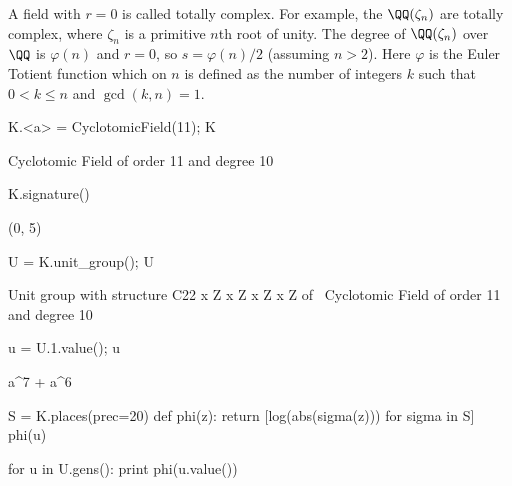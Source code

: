 A field with $r=0$ is called totally complex.  For
example, the  $\QQ(\zeta_n)$ are totally
complex, where $\zeta_n$ is a primitive $n$th root of
unity.  The degree of $\QQ(\zeta_n)$ over $\QQ$ is $\varphi(n)$ and $r=0$,
so $s=\varphi(n)/2$ (assuming $n>2$).
Here $\varphi$ is the Euler Totient function which on $n$
is defined as the number of integers $k$ such that $0<k\leq n$
and $\gcd(k,n)=1$.
\begin{sagecode}
\begin{sagecell}
K.<a> = CyclotomicField(11); K
\end{sagecell}
\begin{sageout}
Cyclotomic Field of order 11 and degree 10
\end{sageout}
\begin{sagecell}
K.signature()
\end{sagecell}
\begin{sageout}
(0, 5)
\end{sageout}
\begin{sagecell}
U = K.unit_group(); U
\end{sagecell}
\begin{sageout}
Unit group with structure C22 x Z x Z x Z x Z of \
Cyclotomic Field of order 11 and degree 10
\end{sageout}
\begin{sagecell}
u = U.1.value(); u
\end{sagecell}
\begin{sageout}
a^7 + a^6
\end{sageout}
\begin{sagecell}
S = K.places(prec=20)
def phi(z):
return [log(abs(sigma(z))) for sigma in S]
phi(u)
\end{sagecell}
\begin{sageout}
[-1.2566, -0.18533, 0.26982, 0.52028, 0.65180]
\end{sageout}
\begin{sagecell}
for u in U.gens():
print phi(u.value())
\end{sagecell}
\begin{sageout}
[0.00000, 0.00000, 0.00000, -9.5367e-7, 0.00000]
[-1.2566, -0.18533, 0.26982, 0.52028, 0.65180]
[-0.26981, -0.52028, 0.18533, -0.65180, 1.2566]
[0.65180, 0.26981, -1.2566, -0.18533, 0.52029]
[-0.084486, -1.1721, -0.33496, 0.60477, 0.98675]
\end{sageout}
\end{sagecode}


